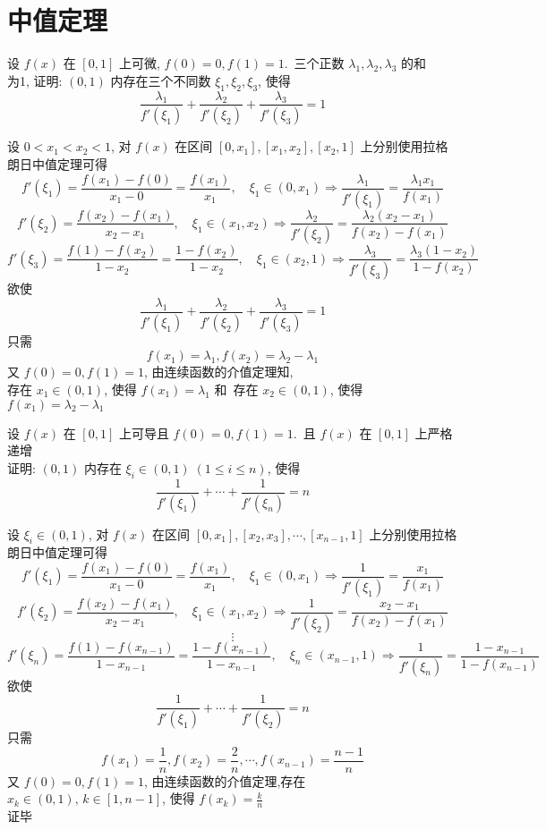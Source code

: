 \documentclass[color=green,titlestyle=hang]{elegantbook}%
\begin{document}
\chapter{中值定理}

\begin{exercise}设 $f(x)$ 在 $[0,1]$ 上可微, $f(0)=0,f(1)=1$.\, 三个正数 $\lambda_1,\lambda_2,\lambda_3$ 的和\\
为1,	证明: $(0,1)$ 内存在三个不同数  $\xi_1,\xi_2,\xi_3$, 使得\[\frac{\lambda_1}{f'(\xi_1)}+\frac{\lambda_2}{f'(\xi_2)}+\frac{\lambda_3}{f'(\xi_3)}=1\]
\end{exercise}\begin{newproof}
设 $0<x_1<x_2<1$, 对 $f(x)$ 在区间 $[0,x_1],[x_1,x_2],[x_2,1]$ 上分别使用拉格朗日中值定理可得
\[f'(\xi_1)=\frac{f(x_1)-f(0)}{x_1-0}=\frac{f(x_1)}{x_1},\quad \xi_1\in(0,x_1)\Longrightarrow\frac{\lambda_1}{f'(\xi_1)}=\frac{\lambda_1x_1}{f(x_1)}\]
\[f'(\xi_2)=\frac{f(x_2)-f(x_1)}{x_2-x_1},\quad \xi_1\in(x_1,x_2)\Longrightarrow\frac{\lambda_2}{f'(\xi_2)}=\frac{\lambda_2(x_2-x_1)}{f(x_2)-f(x_1)}\]
\[f'(\xi_3)=\frac{f(1)-f(x_2)}{1-x_2}=\frac{1-f(x_2)}{1-x_2},\quad \xi_1\in(x_2,1)\Longrightarrow\frac{\lambda_3}{f'(\xi_3)}=\frac{\lambda_3(1-x_2)}{1-f(x_2)}\]
欲使\[\frac{\lambda_1}{f'(\xi_1)}+\frac{\lambda_2}{f'(\xi_2)}+\frac{\lambda_3}{f'(\xi_3)}=1\]
只需\[f(x_1)=\lambda_1,f(x_2)=\lambda_2-\lambda_1\] 
又 $f(0)=0,f(1)=1$, 由连续函数的介值定理知,\\
存在 $x_1\in(0,1)$, 使得 $f(x_1)=\lambda_1$ 和\, 存在 $x_2\in(0,1)$, 使得 $f(x_1)=\lambda_2-\lambda_1$ 
\end{newproof}

\begin{exercise}设 $f(x)$ 在 $[0,1]$ 上可导且 $f(0)=0,f(1)=1$.\, 且 $f(x)$ 在 $[0,1]$ 上严格递增\\
证明: $(0,1)$ 内存在 $\xi_i\in(0,1)\;(1\leqslant i\leqslant n)$, 使得\[\frac{1}{f'(\xi_1)}+\cdots+\frac{1}{f'(\xi_n)}=n\]
\end{exercise}\begin{newproof}
设 $\xi_i\in(0,1)$, 对 $f(x)$ 在区间 $[0,x_1], [x_2,x_3], \cdots, [x_{n-1},1]$ 上分别使用拉格朗日中值定理可得
\[f'(\xi_1)=\frac{f(x_1)-f(0)}{x_1-0}=\frac{f(x_1)}{x_1},\quad \xi_1\in(0,x_1)\Longrightarrow\frac{1}{f'(\xi_1)}=\frac{x_1}{f(x_1)}\]
\[f'(\xi_2)=\frac{f(x_2)-f(x_1)}{x_2-x_1},\quad \xi_1\in(x_1,x_2)\Longrightarrow\frac{1}{f'(\xi_2)}=\frac{x_2-x_1}{f(x_2)-f(x_1)}\]
\[\vdots\]
\[f'(\xi_n)=\frac{f(1)-f(x_{n-1})}{1-x_{n-1}}=\frac{1-f(x_{n-1})}{1-x_{n-1}},\quad \xi_n\in(x_{n-1},1)\Longrightarrow\frac{1}{f'(\xi_n)}=\frac{1-x_{n-1}}{1-f(x_{n-1})}\]	
欲使\[\frac{1}{f'(\xi_1)}+\cdots+\frac{1}{f'(\xi_2)}=n\]
只需\[f(x_1)=\frac{1}{n},f(x_2)=\frac{2}{n},\cdots,f(x_{n-1})=\frac{n-1}{n}\] 
又 $f(0)=0,f(1)=1$, 由连续函数的介值定理,存在 $x_k\in(0,1),\,k\in[1,n-1]$, 使得 $f(x_k)=\frac{k}{n}$ \\
证毕
\end{newproof}
\end{document}
